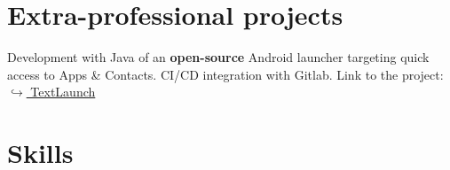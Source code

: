 \documentclass[10pt,a4paper,sans]{moderncv}%
\begin{document}
\section{Extra-professional projects}
    {Development with Java of an \textbf{open-source} Android launcher targeting quick access to Apps \& Contacts. CI/CD integration with Gitlab. Link to the project: \href{https://gitlab.com/MisterFruits/TextLaunch}{$\hookrightarrow$ TextLaunch}}


\section{Skills}

\end{document}
